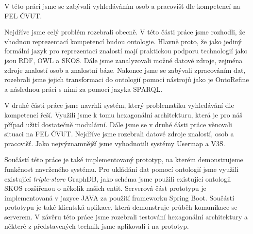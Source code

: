 \begin{abstract-czech}
    	V této práci jsme se zabývali vyhledáváním osob a pracovišť dle kompetencí na FEL ČVUT.\par
    	Nejdříve jsme celý problém rozebrali obecně. V této části práce jsme rozhodli, že vhodnou reprezentací kompetencí budou ontologie. Hlavně proto, že jako jediný formální jazyk pro reprezentaci znalostí mají praktickou podporu technologií jako jsou RDF, OWL a SKOS. Dále jsme zanalyzovali možné datové zdroje, zejména zdroje znalostí osob a znalostní báze. Nakonec jsme se zabývali zpracováním dat, rozebrali jsme jejich transformaci do ontologií pomocí nástrojů jako je OntoRefine a následnou práci s nimi za pomoci jazyka SPARQL.\par
    	V druhé části práce jsme navrhli systém, který problematiku vyhledávání dle kompetencí řeší. Využili jsme k tomu hexagonální architekturu, která je pro náš případ užití dostatečně modulární. Dále jsme se v druhé části práce věnovali situaci na FEL ČVUT. Nejdříve jsme rozebrali datové zdroje znalostí, osob a pracovišť. Jako nejvýznamnější jsme vyhodnotili systémy Usermap a V3S.\par 
    	Součástí této práce je také implementovaný prototyp, na kterém demonstrujeme funkčnost navrženého systému. Pro ukládání dat pomocí ontologií jsme využili existující \textit{triple-store} GraphDB, jako schéma jsme použili existující ontologii SKOS rozšířenou o několik našich entit. Serverová část prototypu je implementovaná v jazyce JAVA za použití frameworku Spring Boot. Součástí prototypu je také klientská aplikace, která demonstruje průběh komunikace se serverem. V závěru této práce jsme rozebrali testování hexagonální architektury a některé z představených technik jsme aplikovali i na prototyp.
    	\newpage
    	
\end{abstract-czech}